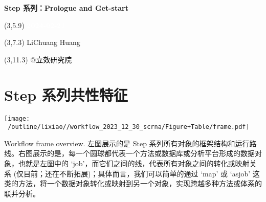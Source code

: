 \documentclass[
]{article}
\author{}
\date{\vspace{-2.5em}}
\begin{document}
\begin{titlepage} 
\begin{center} \textbf{\Huge Step 系列：Prologue
and Get-start} \vspace{4em}
\begin{textblock}{10}(3,5.9) \huge
\textbf{\textcolor{white}{2024-02-21}}
\end{textblock} \begin{textblock}{10}(3,7.3)
\Large \textcolor{black}{LiChuang Huang}
\end{textblock} \begin{textblock}{10}(3,11.3)
\Large \textcolor{black}{@立效研究院}
\end{textblock} \end{center} \end{titlepage}
\restoregeometry


\tableofcontents

\listoftables

\newpage


\hypertarget{step}{%
\section{Step 系列共性特征}\label{step}}



\def\@captype{figure}
\begin{center}
\texttt{[image: ~/outline/lixiao//workflow\_2023\_12\_30\_scrna/Figure+Table/frame.pdf]}
\caption{Workflow frame overview. 左图展示的是 Step 系列所有对象的框架结构和运行路线。右图展示的是，每一个圆球都代表一个方法或数据库或分析平台形成的数据对象，也就是左图中的 `job'，而它们之间的线，代表所有对象之间的转化或映射关系 (仅目前；还在不断拓展)；具体而言，我们可以简单的通过 `map' 或 `asjob' 这类的方法，将一个数据对象转化或映射到另一个对象，实现跨越多种方法或体系的联并分析。}\label{fig:Workflow frame overview. 左图展示的是 Step 系列所有对象的框架结构和运行路线。右图展示的是，每一个圆球都代表一个方法或数据库或分析平台形成的数据对象，也就是左图中的 `job'，而它们之间的线，代表所有对象之间的转化或映射关系 (仅目前；还在不断拓展)；具体而言，我们可以简单的通过 `map' 或 `asjob' 这类的方法，将一个数据对象转化或映射到另一个对象，实现跨越多种方法或体系的联并分析。}
\end{center}
\end{document}
